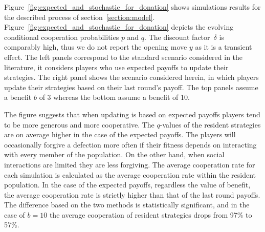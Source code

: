 \documentclass[11pt]{article}
\theoremstyle{plainCl1}
\theoremstyle{plainCl2}
\begin{document}
Figure~\ref{fig:expected_and_stochastic_for_donation} shows simulations results
for the described process of section~\ref{section:model}.
Figure~\ref{fig:expected_and_stochastic_for_donation} depicts the evolving
conditional cooperation probabilities $p$ and $q$. The discount factor~$\delta$
is comparably high, thus we do not report the opening move \(y\) as it
is a transient effect. The left panels correspond to the
standard scenario considered in the literature, it considers players who use
expected payoffs to update their strategies. The right panel shows the scenario
considered herein, in which players update their strategies based on their last
round’s payoff. The top panels assume a benefit \(b\) of 3 whereas the bottom
assume a benefit of 10.

The figure suggests that when updating is based on expected payoffs players
tend to be more generous and more cooperative. The $q$-values of the resident
strategies are on average higher in the case of the expected payoffs. The
players will occasionally forgive a defection more often if their fitness
depends on interacting with every member of the population. On the other hand,
when social interactions are limited they are less forgiving. The average
cooperation rate for each simulation is calculated as the average
cooperation rate within the resident population. In the case of the expected
payoffs, regardless the value of benefit, the average cooperation rate is
strictly higher than that of the last round payoffs. The difference based on the
two methods is statistically significant, and in the case of $b=10$ the
average cooperation of resident strategies drops from 97\% to 57\%.
\end{document}
